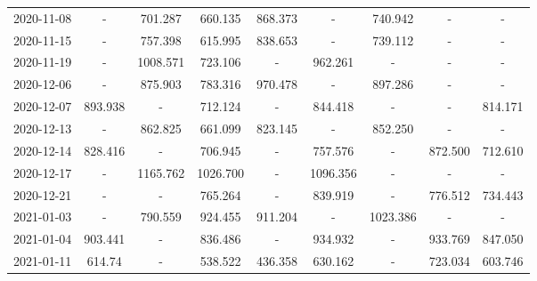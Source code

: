 \begin{table*}[t]
\begin{tabular}{ccccccccc}
2020-11-08 &        - &                        701.287 &   {\cellcolor{blue!25} 660.135} &                        868.373 &         - &   740.942 &         - &                              - \\
2020-11-15 &        - &                        757.398 &   {\cellcolor{blue!25} 615.995} &                        838.653 &         - &   739.112 &         - &                              - \\
2020-11-19 &        - &                       1008.571 &   {\cellcolor{blue!25} 723.106} &                              - &   962.261 &         - &         - &                              - \\
2020-12-06 &        - &                        875.903 &   {\cellcolor{blue!25} 783.316} &                        970.478 &         - &   897.286 &         - &                              - \\
2020-12-07 &  893.938 &                              - &   {\cellcolor{blue!25} 712.124} &                              - &   844.418 &         - &         - &                        814.171 \\
2020-12-13 &        - &                        862.825 &   {\cellcolor{blue!25} 661.099} &                        823.145 &         - &   852.250 &         - &                              - \\
2020-12-14 &  828.416 &                              - &   {\cellcolor{blue!25} 706.945} &                              - &   757.576 &         - &   872.500 &                        712.610 \\
2020-12-17 &        - &                       1165.762 &  {\cellcolor{blue!25} 1026.700} &                              - &  1096.356 &         - &         - &                              - \\
2020-12-21 &        - &                              - &                         765.264 &                              - &   839.919 &         - &   776.512 &  {\cellcolor{blue!25} 734.443} \\
2021-01-03 &        - &  {\cellcolor{blue!25} 790.559} &                         924.455 &                        911.204 &         - &  1023.386 &         - &                              - \\
2021-01-04 &  903.441 &                              - &   {\cellcolor{blue!25} 836.486} &                              - &   934.932 &         - &   933.769 &                        847.050 \\
2021-01-11 &   614.74 &                              - &                         538.522 &  {\cellcolor{blue!25} 436.358} &   630.162 &         - &   723.034 &                        603.746 \\
\bottomrule
\end{tabular}

\end{table*}

